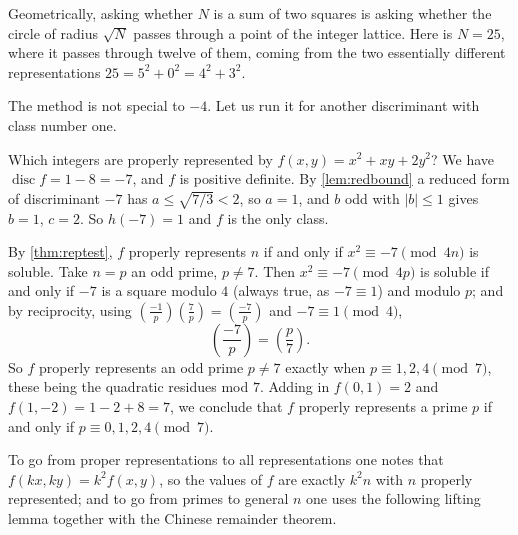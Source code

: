 \documentclass[a4paper]{scrartcl}
\DeclareMathOperator{\disc}{disc}
\newcommand{\leg}[2]{\left( \frac{#1}{#2} \right)}
\begin{document}
Geometrically, asking whether $N$ is a sum of two squares is asking whether the circle of radius $\sqrt N$ passes through a point of the integer lattice. Here is $N = 25$, where it passes through twelve of them, coming from the two essentially different representations $25 = 5^2 + 0^2 = 4^2 + 3^2$.

\begin{center}
\end{center}

The method is not special to $-4$. Let us run it for another discriminant with class number one.

\begin{example}
	Which integers are properly represented by $f(x,y) = x^2 + xy + 2y^2$? We have $\disc f = 1 - 8 = -7$, and $f$ is positive definite. By \autoref{lem:redbound} a reduced form of discriminant $-7$ has $a \leq \sqrt{7/3} < 2$, so $a = 1$, and $b$ odd with $|b| \leq 1$ gives $b = 1$, $c = 2$. So $h(-7) = 1$ and $f$ is the only class.

	By \autoref{thm:reptest}, $f$ properly represents $n$ if and only if $x^2 \equiv -7 \pmod{4n}$ is soluble. Take $n = p$ an odd prime, $p \neq 7$. Then $x^2 \equiv -7 \pmod{4p}$ is soluble if and only if $-7$ is a square modulo $4$ (always true, as $-7 \equiv 1$) and modulo $p$; and by reciprocity, using $\left( \frac{-1}p \right)\left( \frac 7p \right) = \left( \frac{-7}p \right)$ and $-7 \equiv 1 \pmod 4$,
	$$
	\leg{-7}p = \leg p7.
	$$
	So $f$ properly represents an odd prime $p \neq 7$ exactly when $p \equiv 1, 2, 4 \pmod 7$, these being the quadratic residues mod $7$. Adding in $f(0,1) = 2$ and $f(1,-2) = 1 - 2 + 8 = 7$, we conclude that $f$ properly represents a prime $p$ if and only if $p \equiv 0, 1, 2, 4 \pmod 7$.
\end{example}

To go from proper representations to all representations one notes that $f(kx, ky) = k^2f(x,y)$, so the values of $f$ are exactly $k^2 n$ with $n$ properly represented; and to go from primes to general $n$ one uses the following lifting lemma together with the Chinese remainder theorem.
\end{document}
